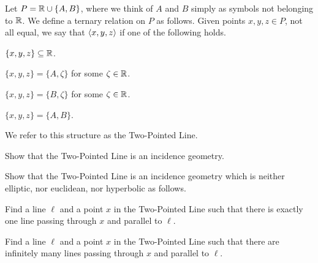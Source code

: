 \begin{dfn}
Let \(P = \mathbb{R} \cup \{A,B\}\), where we think of \(A\) and \(B\) simply as symbols not belonging to \(\mathbb{R}\).
We define a ternary relation on \(P\) as follows.
Given points \(x,y,z \in P\), not all equal, we say that \(\langle x, y, z \rangle\) if one of the following holds.
\begin{proplist}
\item \(\{x,y,z\} \subseteq \mathbb{R}\).
\item \(\{x,y,z\} = \{A,\zeta\}\) for some \(\zeta \in \mathbb{R}\).
\item \(\{x,y,z\} = \{B,\zeta\}\) for some \(\zeta \in \mathbb{R}\).
\item \(\{x,y,z\} = \{A,B\}\).
\end{proplist}
We refer to this structure as the Two-Pointed Line.
\end{dfn}

\begin{exercise}
Show that the Two-Pointed Line is an incidence geometry.
\end{exercise}

\begin{exercise}
Show that the Two-Pointed Line is an incidence geometry which is neither elliptic, nor euclidean, nor hyperbolic as follows.
\begin{proplist}
\item Find a line \(\ell\) and a point \(x\) in the Two-Pointed Line such that there is exactly one line passing through \(x\) and parallel to \(\ell\).
\item Find a line \(\ell\) and a point \(x\) in the Two-Pointed Line such that there are infinitely many lines passing through \(x\) and parallel to \(\ell\).
\end{proplist}
\end{exercise}

